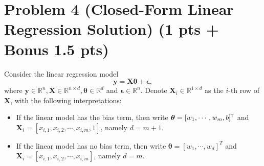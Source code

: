 \documentclass{article}
\newcommand*{\tran}{^{\mkern-1.5mu\mathsf{T}}}
\begin{document}
\section*{Problem 4 (Closed-Form Linear Regression Solution) (1 pts + Bonus 1.5 pts)}
Consider the linear regression model
$$
\mathbf{y} = \mathbf{X}\boldsymbol{\theta} + \boldsymbol{\epsilon},
$$
where $\mathbf{y}\in\mathbb{R}^n, \mathbf{X}\in\mathbb{R}^{n\times d}, \boldsymbol{\theta}\in\mathbb{R}^d$ and $\boldsymbol{\epsilon}\in\mathbb{R}^n$. Denote $\mathbf{X}_i\in \mathbb{R}^{1\times d}$ as the $i$-th row of $\mathbf{X}$, with the following interpretations:
\begin{itemize}
\item If the linear model has the bias term, then write $\boldsymbol{\theta} = [w_1, \cdots, w_m, b]\tran$ and $\mathbf{X}_i = [x_{i,1}, x_{i,2}, \cdots, x_{i,m}, 1]$, namely $d = m+1$.
\item If the linear model has no bias term, then write $\boldsymbol{\theta} = [w_1, \cdots, w_d]^T$ and $\mathbf{X}_i = [x_{i,1}, x_{i,2}, \cdots, x_{i,m}]$, namely $d = m$.
\end{itemize}
%
\end{document}

